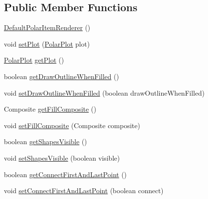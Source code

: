 \subsection*{Public Member Functions}
\begin{DoxyCompactItemize}
\item 
\mbox{\hyperlink{classorg_1_1jfree_1_1chart_1_1renderer_1_1_default_polar_item_renderer_a685c7d11fbc454962d7c3ea9b10ea9ca}{Default\+Polar\+Item\+Renderer}} ()
\item 
void \mbox{\hyperlink{classorg_1_1jfree_1_1chart_1_1renderer_1_1_default_polar_item_renderer_ad296a32b8f8f8c0bd6d460204781eaea}{set\+Plot}} (\mbox{\hyperlink{classorg_1_1jfree_1_1chart_1_1plot_1_1_polar_plot}{Polar\+Plot}} plot)
\item 
\mbox{\hyperlink{classorg_1_1jfree_1_1chart_1_1plot_1_1_polar_plot}{Polar\+Plot}} \mbox{\hyperlink{classorg_1_1jfree_1_1chart_1_1renderer_1_1_default_polar_item_renderer_a9cd32aebbc67cd428f05aafd7cb2c3ff}{get\+Plot}} ()
\item 
boolean \mbox{\hyperlink{classorg_1_1jfree_1_1chart_1_1renderer_1_1_default_polar_item_renderer_a10e69c5cc98d2c8122893ead46a12428}{get\+Draw\+Outline\+When\+Filled}} ()
\item 
void \mbox{\hyperlink{classorg_1_1jfree_1_1chart_1_1renderer_1_1_default_polar_item_renderer_ae655f26d29cf4ec4444b08ee0bf3b6fa}{set\+Draw\+Outline\+When\+Filled}} (boolean draw\+Outline\+When\+Filled)
\item 
Composite \mbox{\hyperlink{classorg_1_1jfree_1_1chart_1_1renderer_1_1_default_polar_item_renderer_ad0f2878f4708e75b46ece61b96767e25}{get\+Fill\+Composite}} ()
\item 
void \mbox{\hyperlink{classorg_1_1jfree_1_1chart_1_1renderer_1_1_default_polar_item_renderer_a42949c2d22766a30753c02ac23da6da8}{set\+Fill\+Composite}} (Composite composite)
\item 
boolean \mbox{\hyperlink{classorg_1_1jfree_1_1chart_1_1renderer_1_1_default_polar_item_renderer_ab3780c76ab7cbe0f2b4a1616c24a1a60}{get\+Shapes\+Visible}} ()
\item 
void \mbox{\hyperlink{classorg_1_1jfree_1_1chart_1_1renderer_1_1_default_polar_item_renderer_a75fd3c1ec9d291e0814efa940c92a758}{set\+Shapes\+Visible}} (boolean visible)
\item 
boolean \mbox{\hyperlink{classorg_1_1jfree_1_1chart_1_1renderer_1_1_default_polar_item_renderer_a0d8ac5495fec5ab1773783d7026b5405}{get\+Connect\+First\+And\+Last\+Point}} ()
\item 
void \mbox{\hyperlink{classorg_1_1jfree_1_1chart_1_1renderer_1_1_default_polar_item_renderer_a595304e875979555b22236935f759ce2}{set\+Connect\+First\+And\+Last\+Point}} (boolean connect)

\end{DoxyCompactItemize}
